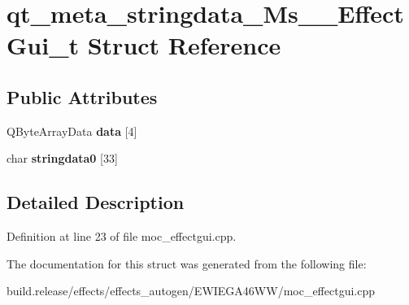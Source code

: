 \hypertarget{structqt__meta__stringdata___ms_____effect_gui__t}{}\section{qt\+\_\+meta\+\_\+stringdata\+\_\+\+Ms\+\_\+\+\_\+\+Effect\+Gui\+\_\+t Struct Reference}
\label{structqt__meta__stringdata___ms_____effect_gui__t}
\subsection*{Public Attributes}
\begin{DoxyCompactItemize}
\item 
\mbox{\label{structqt__meta__stringdata___ms_____effect_gui__t_a526340ac13b287c01ff2cfebf442c176}} 
Q\+Byte\+Array\+Data {\bfseries data} \mbox{[}4\mbox{]}
\item 
\mbox{\label{structqt__meta__stringdata___ms_____effect_gui__t_a10d1e01819039c4a39fbedaf1c61c2cf}} 
char {\bfseries stringdata0} \mbox{[}33\mbox{]}
\end{DoxyCompactItemize}


\subsection{Detailed Description}


Definition at line 23 of file moc\+\_\+effectgui.\+cpp.



The documentation for this struct was generated from the following file\+:\begin{DoxyCompactItemize}
\item 
build.\+release/effects/effects\+\_\+autogen/\+E\+W\+I\+E\+G\+A46\+W\+W/moc\+\_\+effectgui.\+cpp\end{DoxyCompactItemize}
